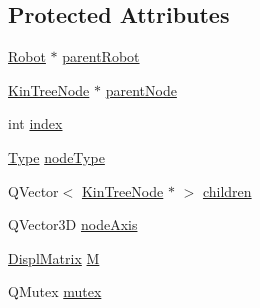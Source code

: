 \subsection*{Protected Attributes}
\begin{DoxyCompactItemize}
\item 
\hyperlink{class_robot_model_1_1_robot}{Robot} $\ast$ \hyperlink{class_robot_model_1_1_kin_tree_node_aabd31bc0263bb2a830bde65af0eba1a6}{parentRobot}
\item 
\hyperlink{class_robot_model_1_1_kin_tree_node}{KinTreeNode} $\ast$ \hyperlink{class_robot_model_1_1_kin_tree_node_af2a0ed90edef2013eeadcd5b5174c420}{parentNode}
\item 
int \hyperlink{class_robot_model_1_1_kin_tree_node_ab7be97fae982037992b0971ab25e643a}{index}
\item 
\hyperlink{class_robot_model_1_1_kin_tree_node_a6cc10fb82046bd1d9f61b806756ad176}{Type} \hyperlink{class_robot_model_1_1_kin_tree_node_acc89f79d42901042ca47a7b56761d4b1}{nodeType}
\item 
QVector$<$ \hyperlink{class_robot_model_1_1_kin_tree_node}{KinTreeNode} $\ast$ $>$ \hyperlink{class_robot_model_1_1_kin_tree_node_abf6a5c4792673635a7733ce24a749890}{children}
\item 
QVector3D \hyperlink{class_robot_model_1_1_kin_tree_node_af69707fb14705d4c1ab4ec6480e18b7e}{nodeAxis}
\item 
\hyperlink{class_robot_model_1_1_displ_matrix}{DisplMatrix} \hyperlink{class_robot_model_1_1_kin_tree_node_adc4909829a61513d89a23ebbf69d8243}{M}
\item 
QMutex \hyperlink{class_robot_model_1_1_kin_tree_node_ab2b663f51d01546b6e45be794a425438}{mutex}
\end{DoxyCompactItemize}


